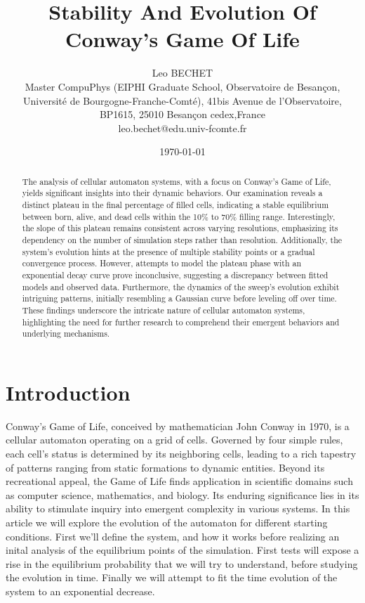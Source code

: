\documentclass{article}
\title{Stability And Evolution Of Conway's Game Of Life}
\author{Leo BECHET  \\
Master CompuPhys (EIPHI Graduate School, Observatoire de Besançon, \\
Université de Bourgogne-Franche-Comté), 41bis Avenue de l’Observatoire, \\
BP1615, 25010 Besançon cedex,France\\
leo.bechet@edu.univ-fcomte.fr
	}
\date{\today}
\begin{document}
\maketitle


\begin{abstract}
    The analysis of cellular automaton systems, with a focus on Conway's Game of
     Life, yields significant insights into their dynamic behaviors. Our 
     examination reveals a distinct plateau in the final percentage of filled 
     cells, indicating a stable equilibrium between born, alive, and dead cells 
     within the 10\% to 70\% filling range. Interestingly, the slope of this 
     plateau remains consistent across varying resolutions, emphasizing its 
     dependency on the number of simulation steps rather than resolution. 
     Additionally, the system's evolution hints at the presence of multiple 
     stability points or a gradual convergence process. However, attempts to model 
     the plateau phase with an exponential decay curve prove inconclusive, 
     suggesting a discrepancy between fitted models and observed data. 
     Furthermore, the dynamics of the sweep's evolution exhibit intriguing 
     patterns, initially resembling a Gaussian curve before leveling off over 
     time. These findings underscore the intricate nature of cellular automaton 
     systems, highlighting the need for further research to comprehend their 
     emergent behaviors and underlying mechanisms.
\end{abstract}

\section{Introduction}
Conway's Game of Life\cite{gardner1970mathematical}, conceived by mathematician John Conway in 1970, 
is a cellular automaton operating on a grid of cells. Governed by four 
simple rules, each cell's status is determined by its neighboring cells, 
leading to a rich tapestry of patterns ranging from static formations to 
dynamic entities. Beyond its recreational appeal, the Game of Life finds 
application in scientific domains such as computer science, mathematics, 
and biology. Its enduring significance lies in its ability to stimulate 
inquiry into emergent complexity in various systems. In this article we 
will explore the evolution of the automaton for different starting
conditions. First we'll define the system, and how it works before realizing
an inital analysis of the equilibrium points of the simulation. First tests will
expose a rise in the equilibrium probability that we will try to understand, before
studying the evolution in time. Finally we will attempt to fit the time evolution of
the system to an exponential decrease. 
\end{document}
